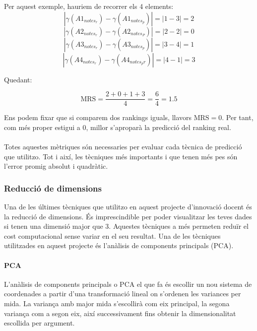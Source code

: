 \documentclass[12pt,a4paper,catalan]{article}
\begin{document}
Per aquest exemple, hauriem de recorrer els 4 elements:
	$$\left|\gamma(A1_{notes_r}) - \gamma(A1_{notes_p})\right| = \left| 1 - 3 \right| = 2$$
	$$\left|\gamma(A2_{notes_r}) - \gamma(A2_{notes_P})\right| = \left| 2 - 2 \right| = 0$$
	$$\left|\gamma(A3_{notes_r}) - \gamma(A3_{notes_p})\right| = \left| 3 - 4 \right| = 1$$
	$$\left|\gamma(A4_{notes_r}) - \gamma(A4_{notes_pr})\right| = \left| 4 - 1 \right| = 3$$

Quedant:

$$ \mathrm{MRS} = \frac{2 + 0 + 1 + 3}{4} = \frac{6}{4} = 1.5$$

Ens podem fixar que si comparem dos rankings iguals, llavors $\mathrm{MRS} = 0$. Per tant, com més proper estigui a 0, millor s'aproparà la predicció del ranking real.
\\
\\
Totes aquestes mètriques són necessaries per evaluar cada tècnica de predicció que utilitzo. Tot i així, les tècniques més importants i que tenen més pes són l'error promig absolut i quadràtic.

\subsubsection{Reducció de dimensions}
Una de les últimes tècniques que utilitzo en aquest projecte d'innovació docent és la reducció de dimensions. És imprescindible per poder visualitzar les teves dades si tenen una dimensió major que 3. Aquestes tècniques a més permeten reduïr el cost computacional sense variar en el seu resultat. Una de les tècniques utilitzades en aquest projecte és l'anàlisis de components principals (PCA).

\paragraph{PCA}
L'anàlisis de components principals o PCA \cite{pca} el que fa és escollir un nou sistema de coordenades a partir d'una transformació lineal on s'ordenen les variances per mida. La variança amb major mida s'escollirà com eix principal, la segona variança com a segon eix, així successivament fins obtenir la dimensionalitat escollida per argument.


\newpage
\end{document}

